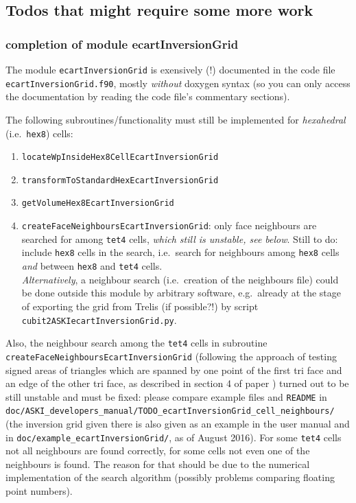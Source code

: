 \documentclass[12pt,a4paper]{article}
\newcommand{\lcode}[1]{\nolinkurl{#1}}
\newcommand{\lcodetitle}[1]{ {\ttfamily #1} }
\begin{document}
\subsection{Todos that might require some more work} \label{ssec-todo:todo-complex}
\subsubsection{completion of module \lcodetitle{ecartInversionGrid}}
The module \lcode{ecartInversionGrid} is exensively (!) documented in the code file \lcode{ecartInversionGrid.f90},
mostly \emph{without} doxygen syntax (so you can only access the documentation by reading the code file's commentary
sections).

The following subroutines/functionality must still be implemented for \emph{hexahedral} (i.e.\ \lcode{hex8}) cells:
\begin{enumerate}
\item \lcode{locateWpInsideHex8CellEcartInversionGrid}
\item \lcode{transformToStandardHexEcartInversionGrid}
\item \lcode{getVolumeHex8EcartInversionGrid}
\item \lcode{createFaceNeighboursEcartInversionGrid}: only face neighbours are searched for among \lcode{tet4}
  cells, \emph{which still is unstable, see below}. Still to do: include \lcode{hex8} cells in the
  search, i.e.\ search for neighbours among \lcode{hex8} cells \emph{and} between \lcode{hex8} and \lcode{tet4} cells.\\
  \emph{Alternatively}, a neighbour search (i.e.\ creation of the neighbours file) could be done outside this module by 
  arbitrary software, e.g.\ already at the stage of exporting the grid from Trelis (if possible?!) by script 
  \lcode{cubit2ASKIecartInversionGrid.py}.
\end{enumerate}

Also, the neighbour search among the \lcode{tet4} cells in subroutine \lcode{createFaceNeighboursEcartInversionGrid} 
(following the approach of testing signed areas of triangles which are spanned by one point of the first tri face 
and an edge of the other tri face, as described in section 4 of paper \cite{devillers:inria-00072100}) 
turned out to be still unstable and must be fixed: please compare example files and \lcode{README} in\\
\lcode{doc/ASKI_developers_manual/TODO_ecartInversionGrid_cell_neighbours/}\\
(the inversion grid given there is also given as an example in the user manual and in
\lcode{doc/example_ecartInversionGrid/}, as of August 2016).
For some \lcode{tet4} cells not all neighbours are found correctly, for some cells not even one of the neighbours
is found. The reason for that should be due to the numerical implementation of the search algorithm (possibly 
problems comparing floating point numbers).
\end{document}
